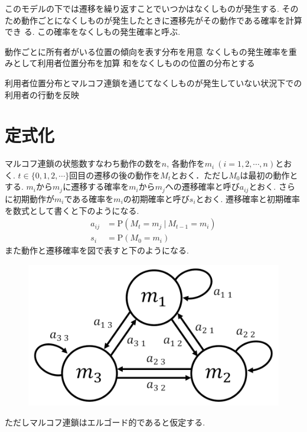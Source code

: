 このモデルの下では遷移を繰り返すことでいつかはなくしものが発生する.
そのため動作ごとになくしものが発生したときに遷移先がその動作である確率を計算でき
る.
この確率をなくしもの発生確率と呼ぶ.


動作ごとに所有者がいる位置の傾向を表す分布を用意
なくしもの発生確率を重みとして利用者位置分布を加算
和をなくしものの位置の分布とする

利用者位置分布とマルコフ連鎖を通じてなくしものが発生していない状況下での利用者の行動を反映

\section{定式化}
マルコフ連鎖の状態数すなわち動作の数を$ n $, 各動作を$ m_i\ (i=1,2,\cdots ,n)$とおく. 
$ t \in \{0,1,2,\cdots\} $回目の遷移の後の動作を$ M_t $とおく．ただし$ M_0 $は最初の動作とする. 
$ m_i $から$ m_j $に遷移する確率を$ m_i $から$ m_j $への遷移確率と呼び$ a_{i j} $とおく. 
さらに初期動作が$ m_i $である確率を$ m_i $の初期確率と呼び$ s_i $とおく. 
遷移確率と初期確率を数式として書くと下のようになる. 
\begin{align}
    a_{i j} &= \mathrm{P}(M_t = m_j\ |\ M_{t-1} = m_i) \\
    s_i &= \mathrm{P}(M_0 = m_i)
\end{align}
また動作と遷移確率を図で表すと下のようになる. 
\begin{figure}[H]
    \begin{center}
    \includegraphics[width=0.5\linewidth]{figs/tr_prob.png}
    \label{fig:a}
    \end{center}
\end{figure}
ただしマルコフ連鎖はエルゴード的\cite{funaki}であると仮定する. 

